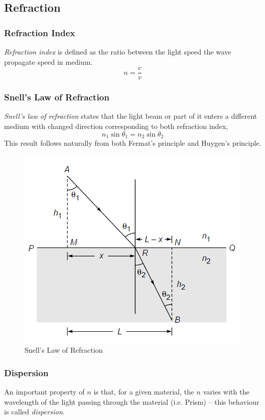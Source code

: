 \documentclass[UTF8]{book}
\begin{document}
\subsection{Refraction}


\subsubsection{Refraction Index}
\emph{Refraction index} is defined as the ratio between the light speed the wave propagate speed in medium.
\[n=\frac{c}{v}\]


\subsubsection{Snell's Law of Refraction}
\emph{Snell's law of refraction} states that the light beam or part of it enters a different medium with changed direction corresponding to both refraction index,
\[n_1\sin \theta_1=n_2\sin \theta_2\]
This result follows naturally from both Fermat's principle and Huygen's principle.
\begin{figure}[H]
\centering
\label{fig:10}
\includegraphics[scale=1]{Figure/10.PNG}
\caption{Snell's Law of Refraction}
\end{figure}


\subsubsection{Dispersion}
An important property of $n$ is that, for a given material, the $n$ varies with the wavelength of the light passing through the material (i.e. Prism) – this behaviour is called \emph{dispersion}.
\end{document}
